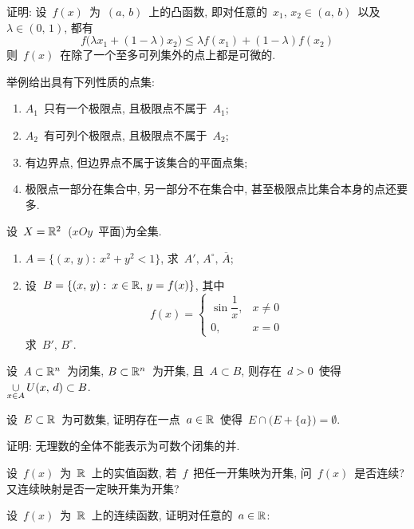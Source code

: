 \begin{problemset}
\item 证明: 设~$f(x)$~为~$(a,\,b)$~上的凸函数, 即对任意的~$x_1,\,x_2 \in (a,\,b)$~以及~$\lambda \in (0,\,1)$, 都有
\[
f\big(\lambda x_1+(1-\lambda)x_2 \big) \leqslant \lambda f(x_1) + (1- \lambda) f(x_2)
\]
则~$f(x)$~在除了一个至多可列集外的点上都是可微的.

\item 举例给出具有下列性质的点集:
\begin{enumerate}
  \item[(1)] $A_1$~只有一个极限点, 且极限点不属于~$A_1$;
  \item[(2)] $A_2$~有可列个极限点, 且极限点不属于~$A_2$;
  \item[(3)] 有边界点, 但边界点不属于该集合的平面点集;
  \item[(4)] 极限点一部分在集合中, 另一部分不在集合中, 甚至极限点比集合本身的点还要多.
\end{enumerate}

\item 设~$X = \mathbb{R}^2$~($xOy$~平面)为全集.

\begin{enumerate}
\item[(1)] $A = \{ (x,\,y): \: x^2 + y^2 < 1\}$, 求~$A',\, A^\circ,\,\overline{A}$;
\item[(2)] 设~$B = \{(x,\,y):\: x \in \mathbb{R}, \, y=f(x)\}$, 其中
\[
f(x) = \left\{ \!\!
\begin{array}{cl}
\sin \dfrac{1}{x}, & x \neq 0 \\[0.2cm]
0, & x=0
\end{array}
\right.
\]
求~$B',\,B^\circ$.
\end{enumerate}

\item 设~$A \subset \mathbb{R}^n$~为闭集, $B \subset \mathbb{R}^n$~为开集, 且~$A \subset B$, 则存在~$d > 0$~使得~$\mathop{\cup}\limits_{x \in A} U(x,\,d) \subset B$.

\item 设~$E \subset \mathbb{R}$~为可数集, 证明存在一点~$a \in \mathbb{R}$~使得~$E \cap \big(E + \{a\}\big) = \emptyset$.

\item 证明: 无理数的全体不能表示为可数个闭集的并.

\item 设~$f(x)$~为~$\mathbb{R}$~上的实值函数, 若~$f$~把任一开集映为开集,
      问~$f(x)$~是否连续? 又连续映射是否一定映开集为开集?

\item 设~$f(x)$~为~$\mathbb{R}$~上的连续函数, 证明对任意的~$a \in \mathbb{R}$:


\end{problemset}
